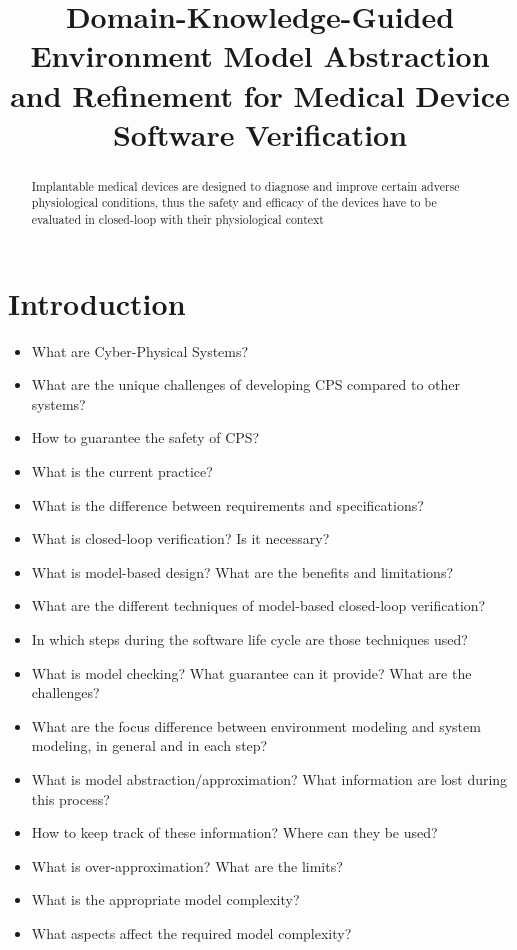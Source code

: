\documentclass{llncs}
\title{Domain-Knowledge-Guided Environment Model Abstraction and Refinement for Medical Device Software Verification}
\begin{document}
\maketitle

\begin{abstract}
Implantable medical devices are designed to diagnose and improve certain adverse physiological conditions, thus the safety and efficacy of the devices have to be evaluated in closed-loop with their physiological context
\end{abstract}

\section{Introduction}
\begin{itemize}
	\item What are Cyber-Physical Systems?
    \item What are the unique challenges of developing CPS compared to other systems?
    \item How to guarantee the safety of CPS?
    \item What is the current practice?
    \item What is the difference between requirements and specifications?
    \item What is closed-loop verification? Is it necessary?
    \item What is model-based design? What are the benefits and limitations?
    \item What are the different techniques of model-based closed-loop verification? 
    \item In which steps during the software life cycle are those techniques used?
    \item What is model checking? What guarantee can it provide? What are the challenges?
    \item What are the focus difference between environment modeling and system modeling, in general and in each step?
    \item What is model abstraction/approximation? What information are lost during this process?
    \item How to keep track of these information? Where can they be used?
    \item What is over-approximation? What are the limits?
    \item What is the appropriate model complexity?
    \item What aspects affect the required model complexity?

\end{itemize}
\end{document}

